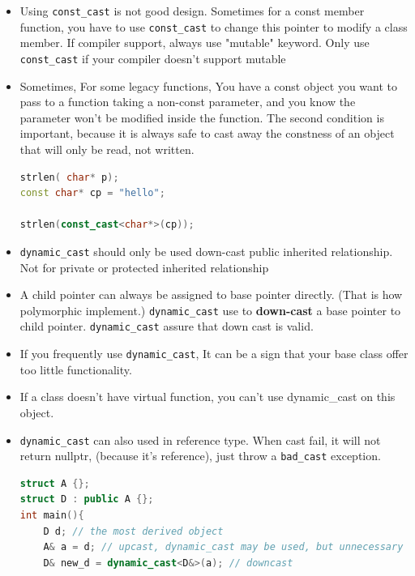 \documentclass[a4paper,12pt,twoside]{book}
\begin{document}
\begin{itemize}
\item Using \texttt{const\_cast} is not good design. Sometimes for a const member function, you have to use \texttt{const\_cast} to change this pointer to modify a class member. If compiler support, always use "mutable"  keyword.  Only use \texttt{const\_cast} if your compiler doesn't support mutable

\item Sometimes, For some legacy functions, You have a const object you want to pass to a function taking a non-const parameter, and you know the parameter won't be modified inside the function. The second condition is important, because it is always safe to cast away the constness of an object that will only be read, not written.

\begin{lstlisting}[frame=single, language=c++, mathescape=true]
strlen( char* p);
const char* cp = "hello";

strlen(const_cast<char*>(cp));
\end{lstlisting}

\item \texttt{dynamic\_cast} should only be used down-cast public inherited relationship. Not for private or protected inherited relationship

\item A child pointer can always be assigned to base pointer directly. (That is how polymorphic implement.) \texttt{dynamic\_cast} use to \textbf{down-cast} a base pointer to child pointer. \texttt{dynamic\_cast} assure that down cast is valid. 

\item If you frequently use \texttt{dynamic\_cast}, It can be a sign that your base class offer too little functionality.

\item If a class doesn't have virtual function, you can't use dynamic\_cast on this object.

\item \texttt{dynamic\_cast} can also used in reference type. When cast fail, it will not return nullptr, (because it's reference), just throw a \texttt{bad\_cast} exception.
\begin{lstlisting}[frame=single, language=c++, mathescape=true]
struct A {};
struct D : public A {};
int main(){
    D d; // the most derived object
    A& a = d; // upcast, dynamic_cast may be used, but unnecessary
    D& new_d = dynamic_cast<D&>(a); // downcast
\end{lstlisting}



\end{itemize}
\end{document}
